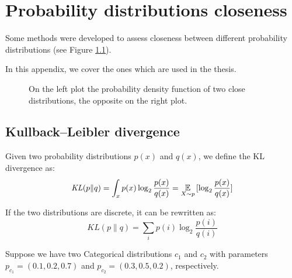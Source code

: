 \chapter{Probability distributions closeness}
Some methods were developed to assess closeness between different probability distributions (see Figure \ref{fig:diffkl}).

In this appendix, we cover the ones which are used in the thesis.

\begin{figure}[h]
    \centering
    \hfill
    \caption{On the left plot the probability density function of two close distributions, the opposite on the right plot.}
    \label{fig:diffkl}
\end{figure}

\section{Kullback–Leibler divergence}
Given two probability distributions $p(x)$ and $q(x)$, we define the KL divergence as:
$$ \mathit{KL}(p \| q) = \int_x p(x) \log_2 \frac{p(x)}{q(x)} = \operatorname*{\mathbb{E}}_{X \sim p}{[\log_2 \frac{p(x)}{q(x)}]}$$

If the two distributions are discrete, it can be rewritten as:
$$ \mathit{KL}(p \| q) = \sum_i p(i) \log_2 \frac{p(i)}{q(i)}$$

Suppose we have two Categorical distributions $c_1$ and $c_2$ with parameters $p_{c_1} = (0.1, 0.2, 0.7)$ and $p_{c_2} = (0.3, 0.5, 0.2)$, respectively.

